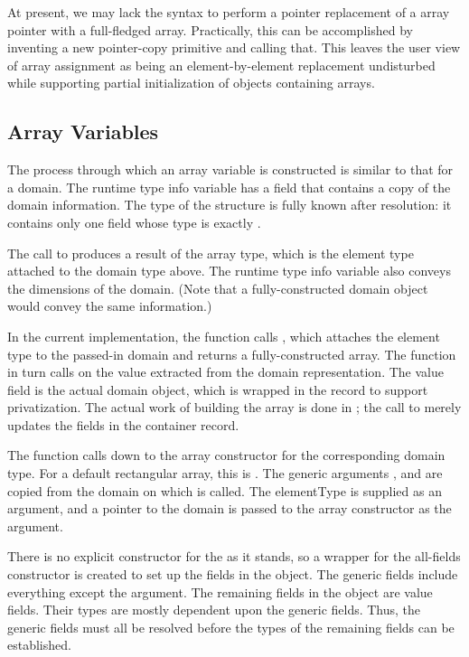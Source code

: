 At present, we may lack the syntax to perform a pointer replacement of a 
array pointer with a full-fledged array.  Practically, this can be accomplished by
inventing a new pointer-copy primitive and calling that.  This leaves the user view of
array assignment as being an element-by-element replacement undisturbed while supporting
partial initialization of objects containing arrays.  


\subsection{Array Variables}

The process through which an array variable is constructed is similar to that for a
domain.  The runtime type info variable has a field that contains a copy of the domain
information. The type of the structure is fully known after resolution: it contains only
one field whose type is exactly .

The call to  produces a result of the array type,
which is the element type  attached to the domain type above.  The runtime
type info variable also conveys the dimensions of the domain.  (Note that a
fully-constructed domain object would convey the same information.)

In the current implementation, the function  calls
, which attaches the element type to the passed-in domain
and returns a fully-constructed array.  The  function in turn calls
 on the value extracted from the domain representation.  The value
field is the actual domain object, which is wrapped in the  record to support
privatization.  The actual work of building the array is done in ; the
call to  merely updates the fields in the container record.

The function  calls down to the array constructor for the
corresponding domain type.  For a default rectangular array, this is
.  The generic arguments ,  and
 are copied from the domain on which  is called.  The
elementType is supplied as an argument, and a pointer to the domain is passed to the
array constructor as the  argument.

There is no explicit constructor for the  as it stands, so a
wrapper for the all-fields constructor is created to set up the fields in the
 object.  The generic fields include everything except the
 argument.  The remaining fields in the object are value fields.  Their types
are mostly dependent upon the generic fields.  Thus, the generic fields must all be
resolved before the types of the remaining fields can be established.

